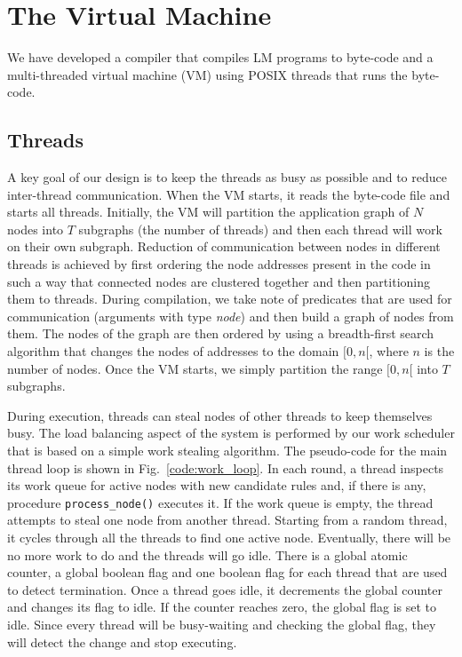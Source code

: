 \section{The Virtual Machine}
\label{virtual_machine}

We have developed a compiler that compiles LM programs to byte-code
and a multi-threaded virtual machine (VM) using POSIX threads
that runs the byte-code.


\subsection{Threads}

A key goal of our design is to keep the threads as busy as possible
and to reduce inter-thread communication. When the VM starts, it reads
the byte-code file and starts all threads. Initially, the VM will
partition the application graph of $N$ nodes into $T$ subgraphs (the
number of threads) and then each thread will work on their own
subgraph. Reduction of communication between nodes in different threads
is achieved by first ordering the node addresses present in the code in such a way that
connected nodes are clustered together and then partitioning them to
threads. During compilation, we take note of predicates that are used
for communication (arguments with type \emph{node}) and
then build a graph of nodes from them. The nodes of
the graph are then ordered by using a breadth-first search algorithm
that changes the nodes of addresses to the domain $[0, n[$, where $n$
is the number of nodes. Once the VM starts, we simply partition the
range $[0, n[$ into $T$ subgraphs.

During execution, threads can steal nodes of other threads to keep
themselves busy. The load balancing aspect of the system is performed
by our work scheduler that is based on a simple work stealing
algorithm. The pseudo-code for the main thread loop is shown in
Fig.~\ref{code:work_loop}. In each round, a thread inspects its work
queue for active nodes with new candidate rules and, if there is any,
procedure \texttt{process\_node()} executes it. If the work queue is
empty, the thread attempts to steal one node from another
thread. Starting from a random thread, it cycles through all the
threads to find one active node. Eventually, there will be no more
work to do and the threads will go idle. There is a global atomic
counter, a global boolean flag and one boolean flag for each thread
that are used to detect termination. Once a thread goes idle, it
decrements the global counter and changes its flag to idle. If the
counter reaches zero, the global flag is set to idle. Since every
thread will be busy-waiting and checking the global flag, they will
detect the change and stop executing.

